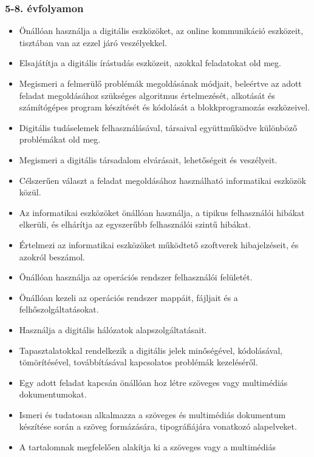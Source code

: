 \hypertarget{evfolyamon-4}{%
\subsubsection{5-8. évfolyamon}\label{evfolyamon-4}}

\begin{itemize}
\item
  Önállóan használja a digitális eszközöket, az online kommunikáció
  eszközeit, tisztában van az ezzel járó veszélyekkel.
\item
  Elsajátítja a digitális írástudás eszközeit, azokkal feladatokat old
  meg.
\item
  Megismeri a felmerülő problémák megoldásának módjait, beleértve az
  adott feladat megoldásához szükséges algoritmus értelmezését,
  alkotását és számítógépes program készítését és kódolását a
  blokkprogramozás eszközeivel.
\item
  Digitális tudáselemek felhasználásával, társaival együttműködve
  különböző problémákat old meg.
\item
  Megismeri a digitális társadalom elvárásait, lehetőségeit és
  veszélyeit.
\item
  Célszerűen választ a feladat megoldásához használható informatikai
  eszközök közül.
\item
  Az informatikai eszközöket önállóan használja, a tipikus felhasználói
  hibákat elkerüli, és elhárítja az egyszerűbb felhasználói szintű
  hibákat.
\item
  Értelmezi az informatikai eszközöket működtető szoftverek
  hibajelzéseit, és azokról beszámol.
\item
  Önállóan használja az operációs rendszer felhasználói felületét.
\item
  Önállóan kezeli az operációs rendszer mappáit, fájljait és a
  felhőszolgáltatásokat.
\item
  Használja a digitális hálózatok alapszolgáltatásait.
\item
  Tapasztalatokkal rendelkezik a digitális jelek minőségével,
  kódolásával, tömörítésével, továbbításával kapcsolatos problémák
  kezeléséről.
\item
  Egy adott feladat kapcsán önállóan hoz létre szöveges vagy multimédiás
  dokumentumokat.
\item
  Ismeri és tudatosan alkalmazza a szöveges és multimédiás dokumentum
  készítése során a szöveg formázására, tipográfiájára vonatkozó
  alapelveket.
\item
  A tartalomnak megfelelően alakítja ki a szöveges vagy a multimédiás

\end{itemize}

